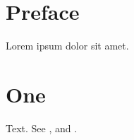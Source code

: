 \documentclass{book}
\begin{document}
\frontmatter
\chapter{Preface}\label{pre}
Lorem ipsum dolor sit amet.\label{p1}
\mainmatter
\chapter{One}\label{c1}
Text.\label{t1}
See ,  and .
\end{document}
